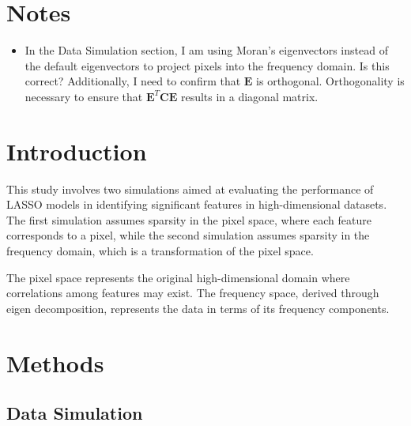 \documentclass[12pt]{article}
\title{}
\author{Siyang Ren}
\date{}
\begin{document}
\maketitle

\section*{Notes}

\begin{itemize}
  \item In the Data Simulation section, I am using Moran's eigenvectors instead of the default eigenvectors to project pixels into the frequency domain. Is this correct? Additionally, I need to confirm that \( \mathbf{E} \) is orthogonal. Orthogonality is necessary to ensure that \( \mathbf{E}^T \mathbf{C} \mathbf{E} \) results in a diagonal matrix.
\end{itemize}

\section*{Introduction}

This study involves two simulations aimed at evaluating the performance of LASSO models in identifying significant features in high-dimensional datasets. The first simulation assumes sparsity in the pixel space, where each feature corresponds to a pixel, while the second simulation assumes sparsity in the frequency domain, which is a transformation of the pixel space.

The pixel space represents the original high-dimensional domain where correlations among features may exist. The frequency space, derived through eigen decomposition, represents the data in terms of its frequency components.


\section*{Methods}

\subsection*{Data Simulation}
\end{document}
